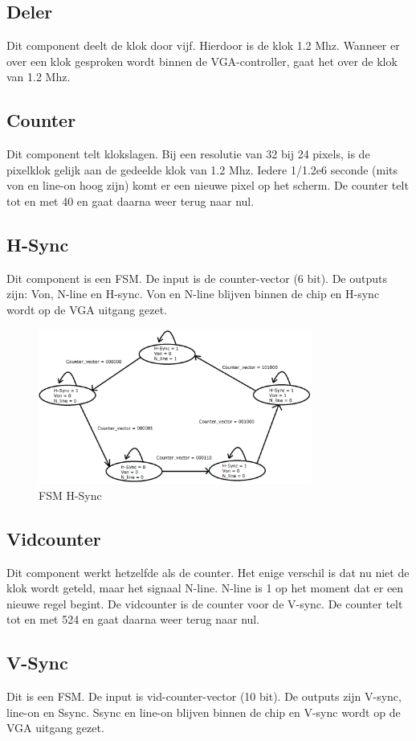 \documentclass[oneside,dutch]{tudelft-report}
\begin{document}
\subsection{Deler}
Dit component deelt de klok door vijf. Hierdoor is de klok 1.2 Mhz. Wanneer er over een klok gesproken wordt binnen de VGA-controller, gaat het over de klok van 1.2 Mhz.

\subsection{Counter}
Dit component telt klokslagen. Bij een resolutie van 32 bij 24 pixels, is de pixelklok gelijk aan de gedeelde klok van 1.2 Mhz. Iedere 1/1.2e6 seconde (mits von en line-on hoog zijn) komt er een nieuwe pixel op het scherm. De counter telt tot en met 40 en gaat daarna weer terug naar nul.

\subsection{H-Sync}
Dit component is een FSM. De input is de counter-vector (6 bit). De outputs zijn: Von, N-line en H-sync. Von en N-line blijven binnen de chip en H-sync wordt op de VGA uitgang gezet.

\begin{figure}[H]
\center
\includegraphics[width=9cm]{FSM-H-sync}
\caption{FSM H-Sync}
\label{VGA}
\end{figure}

\subsection{Vidcounter}
Dit component werkt hetzelfde als de counter. Het enige verschil is dat nu niet de klok wordt geteld, maar het signaal N-line. N-line is 1 op het moment dat er een nieuwe regel begint. De vidcounter is de counter voor de V-sync. De counter telt tot en met 524 en gaat daarna weer terug naar nul.

\subsection{V-Sync}
Dit is een FSM. De input is vid-counter-vector (10 bit). De outputs zijn V-sync, line-on en Ssync. Ssync en line-on blijven binnen de chip en V-sync wordt op de VGA uitgang gezet.
\end{document}
